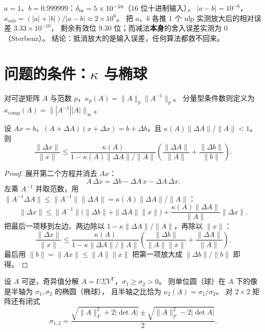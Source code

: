 \begin{remark}[这一节的实测数字]
$a=1$、$b=0.999999$：$\delta_{\rm in}=5\times10^{-16}$（$16$ 位十进制输入），
$|a-b|=10^{-6}$，$\kappa_{\text{sub}}=(|a|+|b|)/|a-b|\approx2\times10^{6}$。
把 $a$、$b$ 各推 $1$ 个 ulp 实测放大后的相对误差 $3.33\times10^{-10}$，
剩余有效位 $9.30$ 位；而减法\textbf{本身}的舍入误差实测为 $0$（Sterbenz）。
结论：抵消放大的是输入误差，任何算法都救不回来。
\end{remark}

\section{问题的条件：$\kappa$ 与椭球}

\begin{definition}[条件数]
对可逆矩阵 $A$ 与范数 $p$，$\kappa_p(A)=\|A\|_p\|A^{-1}\|_p$。
分量型条件数则定义为 $\kappa_{\text{comp}}(A)=\bigl\||A^{-1}||A|\bigr\|_\infty$。
\end{definition}

\begin{theorem}[前向误差界]
\label{thm:forward}
设 $Ax=b$、$(A+\Delta A)(x+\Delta x)=b+\Delta b$，且
$\kappa(A)\|\Delta A\|/\|A\|<1$。则
\[
  \frac{\|\Delta x\|}{\|x\|}
  \le\frac{\kappa(A)}{1-\kappa(A)\|\Delta A\|/\|A\|}
  \left(\frac{\|\Delta A\|}{\|A\|}+\frac{\|\Delta b\|}{\|b\|}\right).
\]
\end{theorem}

\begin{proof}
展开第二个方程并消去 $Ax$：
\[
  A\,\Delta x=\Delta b-\Delta A\,x-\Delta A\,\Delta x .
\]
左乘 $A^{-1}$ 并取范数，用 $\|A^{-1}\Delta A\|\le\|A^{-1}\|\|\Delta A\|=\kappa(A)\|\Delta A\|/\|A\|$：
\[
  \|\Delta x\|\le\|A^{-1}\|\bigl(\|\Delta b\|+\|\Delta A\|\|x\|\bigr)
  +\frac{\kappa(A)\|\Delta A\|}{\|A\|}\|\Delta x\| .
\]
把最后一项移到左边、两边除以 $1-\kappa\|\Delta A\|/\|A\|$，再除以 $\|x\|$：
\[
  \frac{\|\Delta x\|}{\|x\|}\le\frac{\kappa(A)}{1-\kappa\|\Delta A\|/\|A\|}
  \left(\frac{\|\Delta b\|}{\|A\|\|x\|}+\frac{\|\Delta A\|}{\|A\|}\right).
\]
最后用 $\|b\|=\|Ax\|\le\|A\|\|x\|$ 把第一项放大成 $\|\Delta b\|/\|b\|$ 即得。
\end{proof}

\begin{theorem}
\label{thm:ellipse}
设 $A$ 可逆，奇异值分解 $A=U\Sigma V^{\mathsf T}$，$\sigma_1\ge\sigma_2>0$。
则单位圆（球）在 $A$ 下的像是半轴为 $\sigma_1,\sigma_2$ 的椭圆（椭球），
且半轴之比恰为 $\kappa_2(A)=\sigma_1/\sigma_2$。
对 $2\times2$ 矩阵还有闭式
\[
  \sigma_{1,2}=\frac{\sqrt{\|A\|_F^2+2|\det A|}\pm\sqrt{\|A\|_F^2-2|\det A|}}{2}.
\]
\end{theorem}

